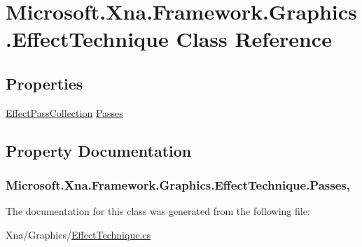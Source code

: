 \hypertarget{class_microsoft_1_1_xna_1_1_framework_1_1_graphics_1_1_effect_technique}{}\section{Microsoft.\+Xna.\+Framework.\+Graphics.\+Effect\+Technique Class Reference}
\label{class_microsoft_1_1_xna_1_1_framework_1_1_graphics_1_1_effect_technique}
\subsection*{Properties}
\begin{DoxyCompactItemize}
\item 
\hyperlink{class_microsoft_1_1_xna_1_1_framework_1_1_graphics_1_1_effect_pass_collection}{Effect\+Pass\+Collection} \hyperlink{class_microsoft_1_1_xna_1_1_framework_1_1_graphics_1_1_effect_technique_a1ec3e7b0fc2f1e48f11dc421e142c2c8}{Passes}
\end{DoxyCompactItemize}


\subsection{Property Documentation}
\hypertarget{class_microsoft_1_1_xna_1_1_framework_1_1_graphics_1_1_effect_technique_a1ec3e7b0fc2f1e48f11dc421e142c2c8}{}
\subsubsection[{Passes}]{ Microsoft.\+Xna.\+Framework.\+Graphics.\+Effect\+Technique.\+Passes\hspace{0.3cm}{\ttfamily [get]}, {\ttfamily [set]}}\label{class_microsoft_1_1_xna_1_1_framework_1_1_graphics_1_1_effect_technique_a1ec3e7b0fc2f1e48f11dc421e142c2c8}


The documentation for this class was generated from the following file\+:\begin{DoxyCompactItemize}
\item 
Xna/\+Graphics/\hyperlink{_effect_technique_8cs}{Effect\+Technique.\+cs}\end{DoxyCompactItemize}
